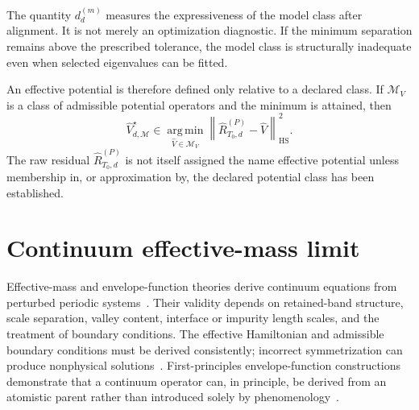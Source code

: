 The quantity $d_d^{(m)}$ measures the expressiveness of the model class after
alignment. It is not merely an optimization diagnostic. If the minimum
separation remains above the prescribed tolerance, the model class is
structurally inadequate even when selected eigenvalues can be fitted.

An effective potential is therefore defined only relative to a declared class.
If $\mathcal M_V$ is a class of admissible potential operators and the minimum
is attained, then
\begin{equation}
    \hat V_{d,\mathcal M}^{\star}
    \in
    \operatorname*{arg\,min}_{\hat V\in\mathcal M_V}
    \left\lVert
        \hat R_{T_0,d}^{(P)}-\hat V
    \right\rVert_{\mathrm{HS}}^2.
\end{equation}
The raw residual $\hat R_{T_0,d}^{(P)}$ is not itself assigned the name
effective potential unless membership in, or approximation by, the declared
potential class has been established.

\section{Continuum effective-mass limit}


Effective-mass and envelope-function theories derive continuum equations from
perturbed periodic systems~\cite{luttingerKohn1955,burt1992,burt1999}. Their
validity depends on retained-band structure, scale separation, valley content,
interface or impurity length scales, and the treatment of boundary conditions.
The effective Hamiltonian and admissible boundary conditions must be derived
consistently; incorrect symmetrization can produce nonphysical
solutions~\cite{foreman1993}. First-principles envelope-function constructions
demonstrate that a continuum operator can, in principle, be derived from an
atomistic parent rather than introduced solely by
phenomenology~\cite{foreman2005}.

